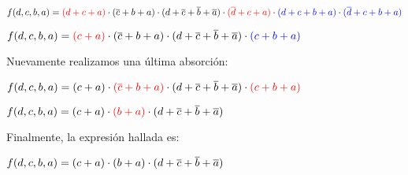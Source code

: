 $f(d,c,b,a)=\color{red}{(d+c+a)}\color{black}\cdot{(\overline{c}+b+a)}\cdot{(d+\overline{c}+\overline{b}+\overline{a})}\cdot\color{red}{(\overline{d}+c+a)}\color{black}\cdot\color{blue}{(d+c+b+a)}\color{black}\cdot\color{blue}{(\overline{d}+c+b+a)}$
\vspace{8mm}\par

$f(d,c,b,a)=\color{red}{(c+a)}\color{black}\cdot{(\overline{c}+b+a)}\cdot{(d+\overline{c}+\overline{b}+\overline{a})}\cdot\color{blue}{(c+b+a)}$
\vspace{8mm}\par

\noindent
\color{black}Nuevamente realizamos una \'ultima absorci\'on:\par\vspace{5mm}

$f(d,c,b,a)=\color{black}{(c+a)}\color{black}\cdot\color{red}{(\overline{c}+b+a)}\color{black}\cdot{(d+\overline{c}+\overline{b}+\overline{a})}\cdot\color{red}{(c+b+a)}$
\vspace{8mm}\par


$f(d,c,b,a)=\color{black}{(c+a)}\color{black}\cdot\color{red}{(b+a)}\color{black}\cdot{(d+\overline{c}+\overline{b}+\overline{a})}$
\vspace{8mm}\par


\noindent
\color{black}Finalmente, la expresi\'on hallada es:\par\vspace{5mm}

$f(d,c,b,a)=\color{black}{(c+a)}\cdot{(b+a)}\cdot{(d+\overline{c}+\overline{b}+\overline{a})}$
\vspace{8mm}\par